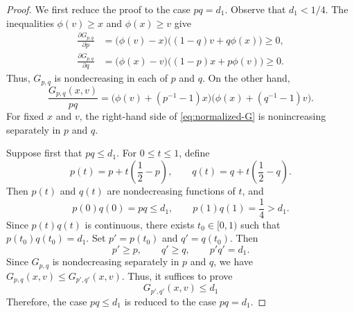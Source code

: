 \documentclass[10pt,a4paper]{amsart}
\begin{document}
\begin{proof}
We first reduce the proof to the case $pq=d_1$. Observe that $d_1<1/4$. The inequalities
$\phi(v)\geq x$ and $\phi(x)\geq v$ give
\begin{align*}
 \frac{\partial G_{p,q}}{\partial p}
 &=
 \bigl(\phi(v)-x\bigr)
 \bigl((1-q)v+q\phi(x)\bigr)
 \geq0,\\
 \frac{\partial G_{p,q}}{\partial q}
 &=
 \bigl(\phi(x)-v\bigr)
 \bigl((1-p)x+p\phi(v)\bigr)
 \geq0.
\end{align*}
Thus, $G_{p,q}$ is nondecreasing in each of $p$ and $q$. On the other
hand,
\begin{equation}
 \frac{G_{p,q}(x,v)}{pq}
 =
 \bigl(\phi(v)+(p^{-1}-1)x\bigr)
 \bigl(\phi(x)+(q^{-1}-1)v\bigr).\label{eq:normalized-G}
\end{equation}
For fixed $x$ and $v$, the right-hand side of
\eqref{eq:normalized-G} is nonincreasing separately in $p$ and $q$.




Suppose first that $pq\leq d_1$. For $0\leq t\leq1$, define
\begin{equation*}
 p(t)=p+t\left(\frac12-p\right),
 \qquad
 q(t)=q+t\left(\frac12-q\right).
\end{equation*}
Then $p(t)$ and $q(t)$ are nondecreasing functions of $t$, and
\begin{equation*}
 p(0)q(0)=pq\leq d_1,
 \qquad
 p(1)q(1)=\frac14>d_1.
\end{equation*}
Since $p(t)q(t)$ is continuous, there exists $t_0\in[0,1)$ such that
$
 p(t_0)q(t_0)=d_1.
$
Set
$
 p'=p(t_0)
$
and 
$
 q'=q(t_0).
$
Then
\begin{equation*}
 p'\geq p,
 \qquad
 q'\geq q,
 \qquad
 p'q'=d_1.
\end{equation*}
Since $G_{p,q}$ is nondecreasing separately in $p$ and $q$, we
have
$
 G_{p,q}(x,v)
 \leq
 G_{p',q'}(x,v).
$
Thus, it suffices to prove
\begin{equation*}
 G_{p',q'}(x,v)\leq d_1
\end{equation*}
Therefore, the case $pq\leq d_1$ is reduced to the case $pq=d_1$.



\end{proof}
\end{document}
